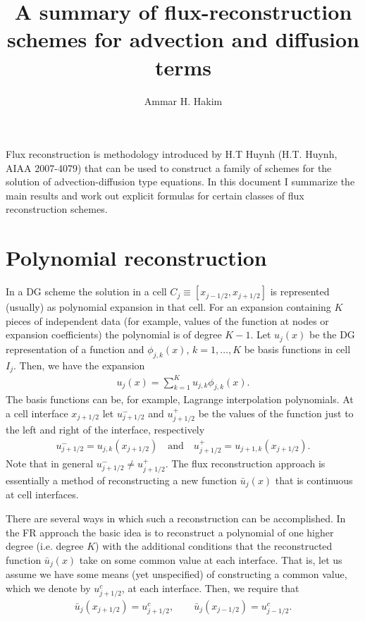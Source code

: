 \documentclass[11pt, reqno]{amsart}
\title[Flux Reconstruction]{A summary of flux-reconstruction schemes
  for advection and diffusion terms}%
\author{Ammar H. Hakim}%
\date{}%
\theoremstyle{definition}
\begin{document}
%
\maketitle

Flux reconstruction is methodology introduced by H.T Huynh
(H.T. Huynh, AIAA 2007-4079) that can be used to construct a family of
schemes for the solution of advection-diffusion type equations. In
this document I summarize the main results and work out explicit
formulas for certain classes of flux reconstruction schemes.

\section{Polynomial reconstruction}

In a DG scheme the solution in a cell $C_j\equiv
[x_{j-1/2},x_{j+1/2}]$ is represented (usually) as polynomial
expansion in that cell. For an expansion containing $K$ pieces of
independent data (for example, values of the function at nodes or
expansion coefficients) the polynomial is of degree $K-1$. Let
$u_j(x)$ be the DG representation of a function and $\phi_{j,k}(x)$,
$k=1,\ldots,K$ be basis functions in cell $I_j$. Then, we have the
expansion
\begin{align}
  u_j(x) = \sum_{k=1}^K u_{j,k} \phi_{j,k}(x).
\end{align}
The basis functions can be, for example, Lagrange interpolation
polynomials. At a cell interface $x_{j+1/2}$ let $u^-_{j+1/2}$ and
$u^+_{j+1/2}$ be the values of the function just to the left and right
of the interface, respectively
\begin{align}
  u_{j+1/2}^- = u_{j,k}(x_{j+1/2}) \quad\mathrm{and}\quad
  u_{j+1/2}^+ = u_{j+1,k}(x_{j+1/2}).
\end{align}
Note that in general $u^-_{j+1/2}\ne u^+_{j+1/2}$. The flux
reconstruction approach is essentially a method of reconstructing a
new function $\bar{u}_j(x)$ that is continuous at cell
interfaces. 

There are several ways in which such a reconstruction can be
accomplished. In the FR approach the basic idea is to reconstruct a
polynomial of one higher degree (i.e. degree $K$) with the additional
conditions that the reconstructed function $\bar{u}_j(x)$ take on some
common value at each interface. That is, let us assume we have some
means (yet unspecified) of constructing a common value, which we
denote by $u_{j+1/2}^c$, at each interface. Then, we require that
\begin{align}
  \bar{u}_{j}(x_{j+1/2}) = u_{j+1/2}^c, \quad\quad
  \bar{u}_{j}(x_{j-1/2}) = u_{j-1/2}^c.
\end{align}
\end{document}
